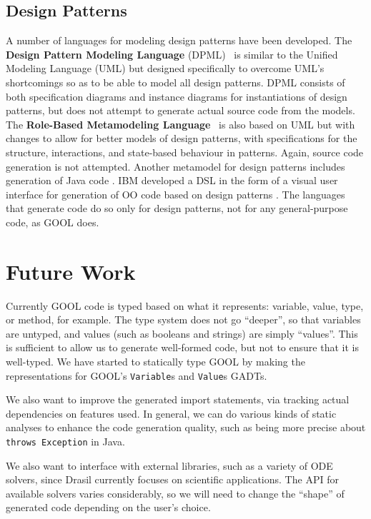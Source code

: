 \documentclass[sigplan,review,prologue,dvipsnames]{acmart}
\begin{document}
\subsection{Design Patterns}

A number of languages for modeling design patterns have been developed. The
\textbf{Design Pattern Modeling Language} (DPML)~\cite{mapelsden2002design} is similar
to the Unified Modeling Language (UML) but designed specifically to overcome
UML's shortcomings so as to be able to model all design patterns. DPML consists of
both specification diagrams and instance diagrams for instantiations of design
patterns, but does not attempt to generate actual source code from the models.
The \textbf{Role-Based Metamodeling Language}~\cite{kim2003uml} is also based on UML but
with changes to allow for better models of design patterns, with specifications
for the structure, interactions, and state-based behaviour in patterns. Again,
source code generation is not attempted. Another metamodel for design patterns
includes generation of Java code \cite{albin2001meta}. IBM developed a DSL in 
the form of a visual user interface for generation of OO code based on design 
patterns \cite{budinsky1996automatic}. The languages that
generate code do so only for design patterns, not for any general-purpose code,
as GOOL does.

\section{Future Work} \label{sec:future}

Currently GOOL code is typed based on what it represents:
variable, value, type, or method, for example. The type system does not
go ``deeper'', so that variables are untyped, and values (such as booleans
and strings) are simply ``values''.  This is sufficient to allow us to
generate well-formed code, but not to ensure that it is well-typed.
We have started to statically type GOOL by making the
representations for GOOL's \verb|Variable|s and \verb|Value|s GADTs. 

We also want to improve the generated import statements, via tracking
actual dependencies on features used.  In general, we can do various 
kinds of static analyses to enhance the code generation quality,
such as being more precise about \verb|throws Exception| in Java.

We also want to interface with external libraries, such as a variety of ODE
solvers, since Drasil currently focuses on scientific applications. The API for
available solvers varies considerably, so we will need to change the ``shape''
of generated code depending on the user's choice.
\end{document}
